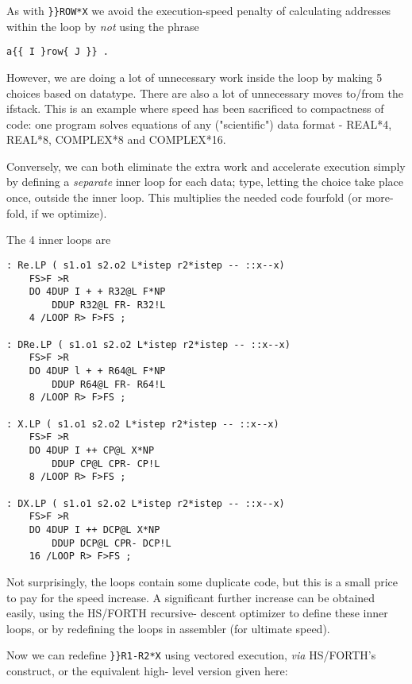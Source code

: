 As with \verb|}}ROW*X| we avoid the execution-speed penalty of
calculating addresses within the loop by \textit{not} using the phrase
\begin{verbatim}
a{{ I }row{ J }} .
\end{verbatim}
However, we are doing a lot of unnecessary work inside the loop
by making 5 choices based on datatype. There are also a lot of
unnecessary moves to/from the ifstack. This is an example where
speed has been sacrificed to compactness of code: one program
solves equations of any ("scientific") data format - REAL*4,
REAL*8, COMPLEX*8 and COMPLEX*16. 

Conversely, we can both eliminate the extra work and accelerate
execution simply by defining a \textit{separate} inner loop for each data;
type, letting the choice take place once, outside the inner loop.
This multiplies the needed code fourfold (or more-fold, if we
optimize).

The 4 inner loops are
\begin{verbatim}
: Re.LP ( s1.o1 s2.o2 L*istep r2*istep -- ::x--x)
    FS>F >R
    DO 4DUP I + + R32@L F*NP
        DDUP R32@L FR- R32!L
    4 /LOOP R> F>FS ;

: DRe.LP ( s1.o1 s2.o2 L*istep r2*istep -- ::x--x)
    FS>F >R
    DO 4DUP l + + R64@L F*NP
        DDUP R64@L FR- R64!L
    8 /LOOP R> F>FS ;

: X.LP ( s1.o1 s2.o2 L*istep r2*istep -- ::x--x)
    FS>F >R
    DO 4DUP I ++ CP@L X*NP
        DDUP CP@L CPR- CP!L
    8 /LOOP R> F>FS ;

: DX.LP ( s1.o1 s2.o2 L*istep r2*istep -- ::x--x)
    FS>F >R
    DO 4DUP I ++ DCP@L X*NP
        DDUP DCP@L CPR- DCP!L
    16 /LOOP R> F>FS ;
\end{verbatim} 
Not surprisingly, the loops contain some duplicate code, but this
is a small price to pay for the speed increase. A significant further
increase can be obtained easily, using the HS/FORTH recursive-
descent optimizer to define these inner loops, or by redefining
the loops in assembler (for ultimate speed).

Now we can redefine \verb|}}R1-R2*X| using vectored execution, \textit{via}
HS/FORTH's  construct, or the equivalent high-
level version given here:

